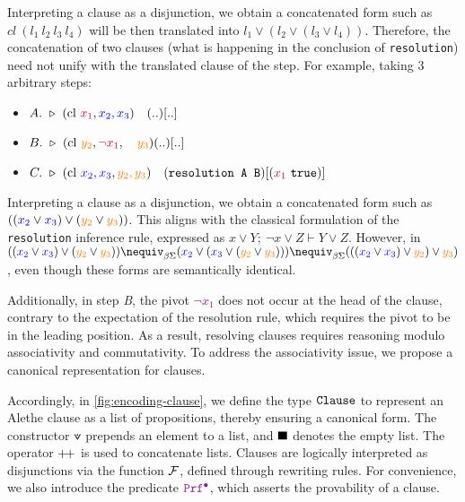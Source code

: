 \begin{remark}
Interpreting a clause as a disjunction, we obtain a concatenated form such as $cl~(l_1~l_2~l_3~l_4)$ will be then translated into $l_1 \lor (l_2 \lor (l_3 \lor l_4))$.
 Therefore, the concatenation of two clauses (what is happening in the conclusion of \texttt{resolution}) need not unify with the translated clause of the step. For example, taking 3 arbitrary steps:

\begin{itemize}
    \setlength{\itemsep}{5pt}
    \setlength{\parskip}{0pt}
    \item[] $A.~\triangleright~(\text{cl}~\textcolor{purple}{x_1}, \textcolor{blue}{x_2, x_3}) \quad (..)[..]$
    \item[] $B.~\triangleright~ (\text{cl}~\textcolor{orange}{y_2}, \textcolor{purple}{\neg x_1}, \quad \textcolor{orange}{y_3}) (..)[..]$
    \item[] $C.~\triangleright~(\text{cl}~\textcolor{blue}{x_2, x_3}, \textcolor{orange}{y_2, y_3}) \quad (\texttt{resolution A B})[(\textcolor{purple}{x_1}~\texttt{true})]$  %
\end{itemize}

Interpreting a clause as a disjunction, we obtain a concatenated form such as $((\textcolor{blue}{x_2} \lor \textcolor{blue}{x_3}) \lor (\textcolor{orange}{y_2} \lor \textcolor{orange}{y_3}))$.
This aligns with the classical formulation of the \texttt{resolution} inference rule, expressed as $x \lor Y;\ \neg x \lor Z \vdash Y \lor Z$.
However, in {\lpm} $((\textcolor{blue}{x_2} \lor \textcolor{blue}{x_3}) \lor (\textcolor{orange}{y_2} \lor \textcolor{orange}{y_3})) \nequiv_{\beta\Sigma} (\textcolor{blue}{x_2} \lor (\textcolor{blue}{x_3} \lor (\textcolor{orange}{y_2} \lor \textcolor{orange}{y_3})))
\nequiv_{\beta\Sigma} (((\textcolor{blue}{x_2} \lor \textcolor{blue}{x_3}) \lor \textcolor{orange}{y_2}) \lor \textcolor{orange}{y_3})$ , even though these forms are semantically identical.

Additionally, in step \emph{B}, the pivot \textcolor{purple}{$\neg x_1$} does not occur at the head of the clause, contrary to the expectation of the resolution rule,
which requires the pivot to be in the leading position. As a result, resolving clauses requires reasoning modulo associativity and commutativity.
To address the associativity issue, we propose a canonical representation for clauses.

Accordingly, in \cref{fig:encoding-clause}, we define the type $\kw{Clause}$ to represent an Alethe clause as a list of propositions, thereby ensuring a canonical form.
The constructor $\veedot$ prepends an element to a list, and $\nil$ denotes the empty list. The operator $\pp$ is used to concatenate lists. 
Clauses are logically interpreted as disjunctions via the function $\cal{F}$, defined through rewriting rules. For convenience, we also introduce the predicate $\pid$, which asserts the provability of a clause.
\end{remark}

